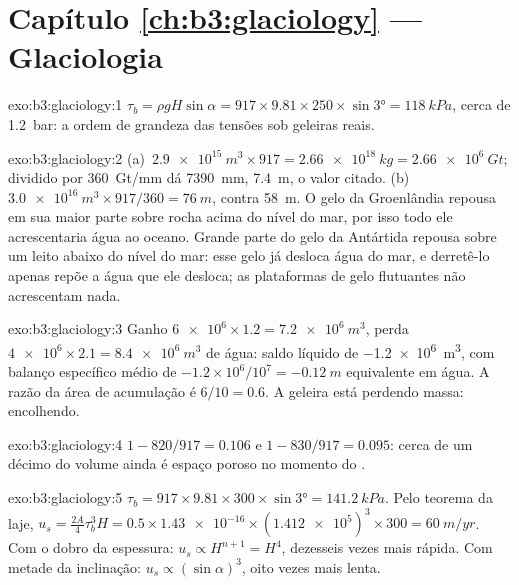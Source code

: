 \section*{Capítulo \ref{ch:b3:glaciology} --- Glaciologia}

\begin{solution}{exo:b3:glaciology:1}
$\tau_b = \rho gH\sin\alpha = 917\times9.81\times250\times\sin\ang{3} =
\qty{118}{kPa}$, cerca de \qty{1.2}{bar}: a ordem de grandeza das tensões
sob geleiras reais.
\end{solution}

\begin{solution}{exo:b3:glaciology:2}
(a)~$\qty{2.9e15}{m^3}\times917 = \qty{2.66e18}{kg} = \qty{2.66e6}{Gt}$;
dividido por \qty{360}{Gt/mm} dá \qty{7390}{mm}, \qty{7.4}{m}, o valor citado.
(b)~$\qty{3.0e16}{m^3}\times917/360 = \qty{76}{m}$, contra \qty{58}{m}.
O gelo da Groenlândia repousa em sua maior parte sobre rocha acima do nível do mar, por isso todo ele
acrescentaria água ao oceano. Grande parte do gelo da Antártida repousa sobre um leito abaixo do
nível do mar: esse gelo já desloca água do mar, e derretê-lo apenas repõe a água que ele desloca;
as plataformas de gelo flutuantes não acrescentam nada.
\end{solution}

\begin{solution}{exo:b3:glaciology:3}
Ganho $\num{6e6}\times1.2 = \qty{7.2e6}{m^3}$, perda $\num{4e6}\times2.1 =
\qty{8.4e6}{m^3}$ de água: saldo líquido de \qty{-1.2e6}{m^3}, com balanço específico médio
de $-1.2\times10^6/10^7 = \qty{-0.12}{m}$ equivalente em água. A
razão da área de acumulação é $6/10 = 0.6$. A geleira está perdendo massa:
encolhendo.
\end{solution}

\begin{solution}{exo:b3:glaciology:4}
$1 - 820/917 = \num{0.106}$ e $1 - 830/917 = \num{0.095}$: cerca de um décimo
do volume ainda é espaço poroso no momento do .
\end{solution}

\begin{solution}{exo:b3:glaciology:5}
$\tau_b = 917\times9.81\times300\times\sin\ang{3} = \qty{141.2}{kPa}$. Pelo
teorema da laje, $u_s = \tfrac{2A}{4}\tau_b^3H = 0.5\times\num{1.43e-16}
\times(\num{1.412e5})^3\times300 = \qty{60}{m/yr}$. Com o dobro da espessura: $u_s
\propto H^{n+1} = H^4$, dezesseis vezes mais rápida. Com metade da inclinação: $u_s \propto
(\sin\alpha)^3$, oito vezes mais lenta.
\end{solution}

